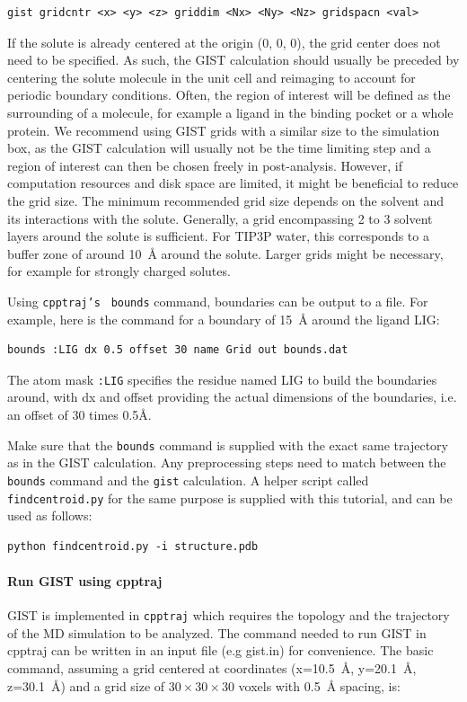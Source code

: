 \documentclass[9pt,tutorial]{livecoms}
\newcommand{\software}{\texttt}
\newcommand\inlinecode{\texttt}
\begin{document}
\begin{lstlisting}[style=cpptraj]
gist gridcntr <x> <y> <z> griddim <Nx> <Ny> <Nz> gridspacn <val>
\end{lstlisting}
If the solute is already centered at the origin (0, 0, 0), the grid center does not need to be specified.
As such, the GIST calculation should usually be preceded by centering the solute molecule in the unit cell and reimaging to account for periodic boundary conditions.
Often, the region of interest will be defined as the surrounding of a molecule, for example a ligand in the binding pocket or a whole protein. 
We recommend using GIST grids with a similar size to the simulation box, as the GIST calculation will usually not be the time limiting step and a region of interest can then be chosen freely in post-analysis.
However, if computation resources and disk space are limited, it might be beneficial to reduce the grid size.
The minimum recommended grid size depends on the solvent and its interactions with the solute.
Generally, a grid encompassing 2 to 3 solvent layers around the solute is sufficient. 
For TIP3P water, this corresponds to a buffer zone of around \SI{10}{\angstrom} around the solute. 
Larger grids might be necessary, for example for strongly charged solutes.

Using \inlinecode{cpptraj's } \inlinecode{bounds} command, boundaries can be output to a file. 
For example, here is the command for a boundary of \SI{15}{\angstrom} around the ligand LIG:
\begin{lstlisting}[style=cpptraj]
bounds :LIG dx 0.5 offset 30 name Grid out bounds.dat
\end{lstlisting}
The atom mask \inlinecode{:LIG} specifies the residue named LIG to build the boundaries around, with dx and offset providing the actual dimensions of the boundaries, i.e. an offset of 30 times 0.5\AA.
\begin{minipage}{\linewidth} 
Make sure that the \inlinecode{bounds} command is supplied with the exact same trajectory as in the GIST calculation. 
Any preprocessing steps need to match between the \inlinecode{bounds} command and the \inlinecode{gist} calculation. 
A helper script called \inlinecode{findcentroid.py} for the same purpose is supplied with this tutorial, and can be used as follows:
~
\begin{lstlisting}[style=bash]
python findcentroid.py -i structure.pdb
\end{lstlisting}
\end{minipage}
\paragraph{Run GIST using cpptraj}
GIST is implemented in \software{cpptraj} which requires the topology and the trajectory of the MD simulation to be analyzed.
The command needed to run GIST in cpptraj can be written in an input file (e.g gist.in) for convenience.
The basic command, assuming a grid centered at coordinates (x=\SI{10.5}{\angstrom}, y=\SI{20.1}{\angstrom}, z=\SI{30.1}{\angstrom}) and a grid size of $30\times30\times30$ voxels with \SI{0.5}{\angstrom} spacing, is:
\end{document}
